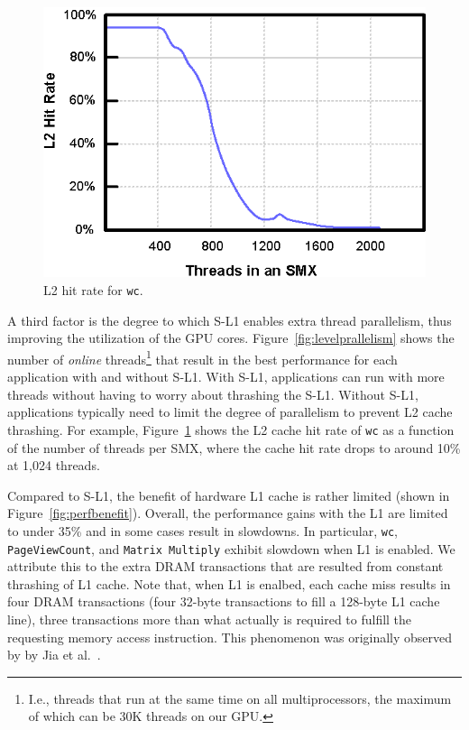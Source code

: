 \begin{figure}[t]
\center
\includegraphics[scale=0.89]{10L2HitRateWC.eps}
\vspace{-0.0cm}
\caption{\footnotesize\textnormal{L2 hit rate for \texttt{wc}.}}
\label{fig:l2hitrate}
\end{figure}

A third factor is the degree to which S-L1 enables extra thread parallelism, thus improving the utilization of the GPU cores.
Figure~\ref{fig:levelprallelism} shows the number of \emph{online} threads\footnote{
    I.e., threads that run at the same time on all multiprocessors, the maximum of which can be 30K threads on our GPU.}
that result in the best performance for each application with and without S-L1.
With S-L1, applications can run with more threads without having to worry about thrashing the S-L1.
Without S-L1, applications typically need to limit the degree of parallelism to prevent L2 cache thrashing.
For example, Figure~\ref{fig:l2hitrate} shows the L2 cache hit rate of \texttt{wc} as a function of
the number of threads per SMX, where the cache hit rate drops to around 10\% at 1,024 threads.

Compared to S-L1, the benefit of hardware L1 cache is rather limited (shown in Figure~\ref{fig:perfbenefit}). Overall, the performance gains with the L1 are limited to under 35\%
and in some cases result in slowdowns. In particular, \texttt{wc},  \texttt{PageViewCount}, and \texttt{Matrix Multiply} exhibit slowdown when L1 is enabled.
We attribute this to the extra DRAM transactions that are resulted from constant thrashing of L1 cache.
Note that, when L1 is enalbed, each cache miss results in four DRAM transactions (four 32-byte transactions to fill a 128-byte L1 cache line), three transactions more than
what actually is required to fulfill the requesting memory access instruction.
This phenomenon was originally observed by by Jia et al.~\cite{jia2012characterizing}.


